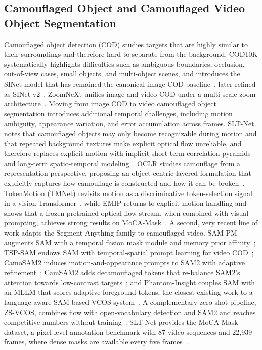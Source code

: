 \documentclass[11pt]{article}
\begin{document}
\subsection{Camouflaged Object and Camouflaged Video Object Segmentation}
Camouflaged object detection (COD) studies targets that are highly similar to their surroundings and therefore hard to separate from the background.
COD10K systematically highlights difficulties such as ambiguous boundaries, occlusion, out-of-view cases, small objects, and multi-object scenes, and introduces the SINet model that has remained the canonical image COD baseline~\cite{cod10k}, later refined as SINet-v2~\cite{sinetv2}.
ZoomNeXt unifies image and video COD under a multi-scale zoom architecture~\cite{zoomnext}.
Moving from image COD to video camouflaged object segmentation introduces additional temporal challenges, including motion ambiguity, appearance variation, and error accumulation across frames.
SLT-Net notes that camouflaged objects may only become recognizable during motion and that repeated background textures make explicit optical flow unreliable, and therefore replaces explicit motion with implicit short-term correlation pyramids and long-term spatio-temporal modeling~\cite{sltnet}.
OCLR studies camouflage from a representation perspective, proposing an object-centric layered formulation that explicitly captures how camouflage is constructed and how it can be broken~\cite{oclrv}.
TokenMotion (TMNet) revisits motion as a discriminative token-selection signal in a vision Transformer~\cite{tmnet}, while EMIP returns to explicit motion handling and shows that a frozen pretrained optical flow stream, when combined with visual prompting, achieves strong results on MoCA-Mask~\cite{emip}.
A second, very recent line of work adapts the Segment Anything family to camouflaged video.
SAM-PM augments SAM with a temporal fusion mask module and memory prior affinity~\cite{sampm}; TSP-SAM endows SAM with temporal-spatial prompt learning for video COD~\cite{tspsam}; CamoSAM2 induces motion-and-appearance prompts to SAM2 with adaptive refinement~\cite{camosam2}; CamSAM2 adds decamouflaged tokens that re-balance SAM2's attention towards low-contrast targets~\cite{camsam2}; and Phantom-Insight couples SAM with an MLLM that scores adaptive foreground tokens, the closest existing work to a language-aware SAM-based VCOS system~\cite{phantominsight}.
A complementary zero-shot pipeline, ZS-VCOS, combines flow with open-vocabulary detection and SAM2 and reaches competitive numbers without training~\cite{zsvcos}.
SLT-Net provides the MoCA-Mask dataset, a pixel-level annotation benchmark with 87 video sequences and 22{,}939 frames, where dense masks are available every five frames~\cite{sltnet}.
\end{document}
